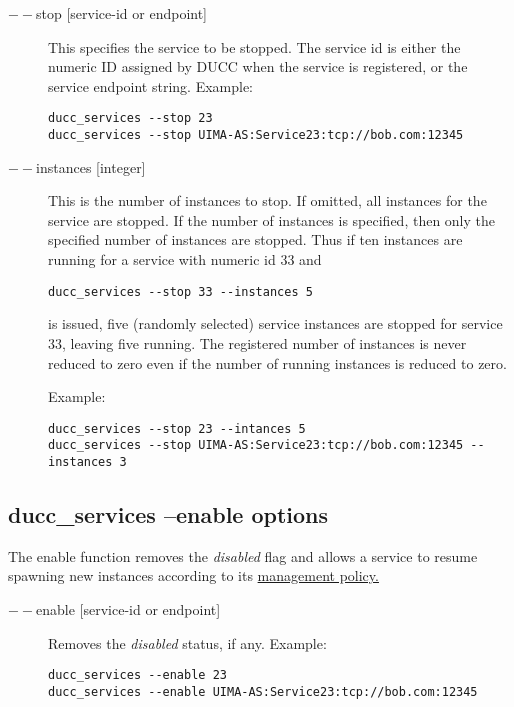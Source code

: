     \begin{description}

  \item[$--$stop {[service-id or endpoint]}] This specifies the service to be stopped. The service id
         is either the numeric ID assigned by DUCC when the service is registered, or the service
         endpoint string. Example:
\begin{verbatim}
ducc_services --stop 23 
ducc_services --stop UIMA-AS:Service23:tcp://bob.com:12345 
\end{verbatim}
         
       \item[$--$instances {[integer]}] This is the number of instances to stop. If omitted, all
         instances for the service are stopped.  If the number of instances is specified, then only
         the specified number of instances are stopped. Thus if ten instances are running for a
         service with numeric id 33 and
\begin{verbatim}
ducc_services --stop 33 --instances 5
\end{verbatim}
         is issued, five (randomly selected) service instances are stopped for
         service 33, leaving five running. The registered number of instances is never reduced to zero even if the number of
         running instances is reduced to zero.

         Example: 
\begin{verbatim}
ducc_services --stop 23 --intances 5 
ducc_services --stop UIMA-AS:Service23:tcp://bob.com:12345 --instances 3  
\end{verbatim}

    \end{description}


    \subsection{ducc\_services --enable options}

    The enable function removes the {\em disabled} flag and allows a service to resume spawning
    new instances according to its \hyperref[sec:service.management-policy]{management policy.}
    
       \begin{description}
       \item[$--$enable {[service-id or endpoint]}] Removes the {\em disabled} status, if any. Example:
\begin{verbatim}
ducc_services --enable 23 
ducc_services --enable UIMA-AS:Service23:tcp://bob.com:12345 
\end{verbatim}
         
       \end{description}

